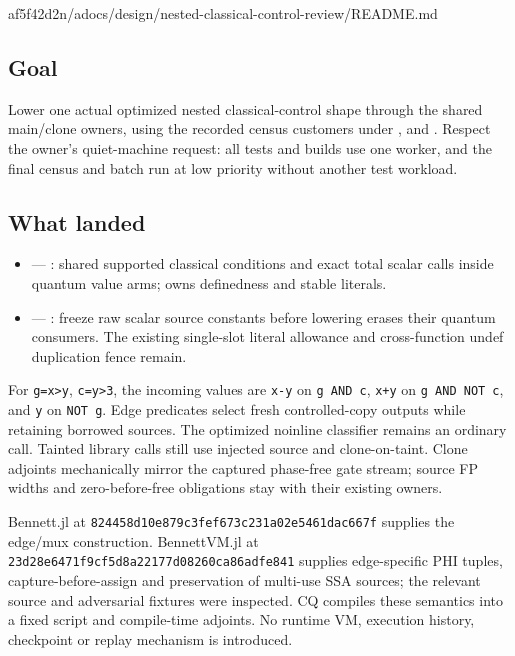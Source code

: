 %
  {af5f42d2}{n/a}{docs/design/nested-classical-control-review/README.md}

\subsection*{Goal}
Lower one actual optimized nested classical-control shape through the shared
main/clone owners, using the recorded census customers under ,
 and . Respect the owner's quiet-machine request:
all tests and builds use one worker, and the final census and batch run at low
priority without another test workload.

\subsection*{What landed}
\begin{itemize}
\item {} --- : shared supported classical
conditions and exact total scalar calls inside quantum value arms;
 owns definedness and stable literals.
\item {} --- : freeze raw scalar source
constants before lowering erases their quantum consumers. The existing
single-slot literal allowance and cross-function undef duplication fence remain.
\end{itemize}

For \texttt{g=x>y}, \texttt{c=y>3}, the incoming values are \texttt{x-y}
on \texttt{g AND c}, \texttt{x+y} on \texttt{g AND NOT c}, and
\texttt{y} on \texttt{NOT g}. Edge predicates select fresh controlled-copy
outputs while retaining borrowed sources. The optimized noinline classifier
remains an ordinary call. Tainted library calls still use injected source and
clone-on-taint. Clone adjoints mechanically mirror the captured phase-free gate
stream; source FP widths and zero-before-free obligations stay with their
existing owners.

Bennett.jl at \texttt{824458d10e879c3fef673c231a02e5461dac667f}
supplies the edge/mux construction. BennettVM.jl at
\texttt{23d28e6471f9cf5d8a22177d08260ca86adfe841} supplies edge-specific
PHI tuples, capture-before-assign and preservation of multi-use SSA sources;
the relevant source and adversarial fixtures were inspected. CQ compiles these
semantics into a fixed script and compile-time adjoints. No runtime VM,
execution history, checkpoint or replay mechanism is introduced.

